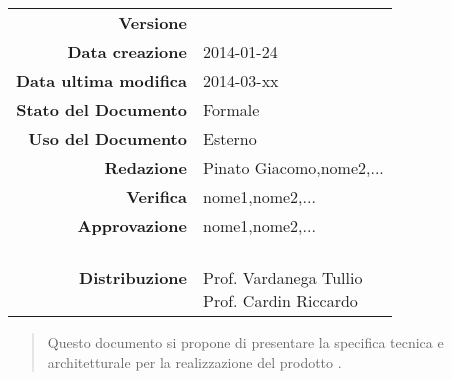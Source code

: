 


\newcommand{\Versione}{\versioneSpecificaTecnica{}}	  %
\newcommand{\Data}{2014-01-24}				           %
\newcommand{\DataUltimaModifica}{2014-03-xx}
\newcommand{\TipoDocumento}{Specifica Tecnica}	       %



\begin{center}
\begin{tabular}{r|l}
\textbf{Versione} & \Versione{} \\
\textbf{Data creazione} & \Data{} \\
\textbf{Data ultima modifica} & \DataUltimaModifica{} \\
\textbf{Stato del Documento} & Formale \\		          %
\textbf{Uso del Documento} & Esterno \\			          %
\textbf{Redazione} &  Pinato Giacomo,nome2,...\\		        %
\textbf{Verifica} & nome1,nome2,...\\			        %
\textbf{Approvazione} & nome1,nome2,...\\				 %
\textbf{Distribuzione} & \parbox[t]{4cm}{\NomeGruppo{}\\Prof. Vardanega Tullio\\Prof. Cardin Riccardo\\ \Prop{} }\\
\end{tabular}
\end{center}

\vspace{0.05in}

\begin{abstract}
\begin{center}
Questo documento si propone di presentare la specifica tecnica e architetturale per la realizzazione del prodotto \Progetto{}.
\end{center}
\end{abstract}

